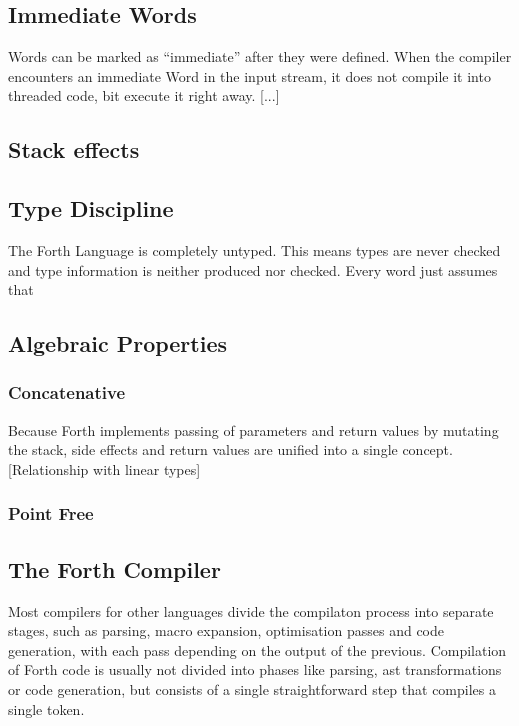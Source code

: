 \documentclass{llncs}
\begin{document}


\subsection{Immediate Words}

Words can be marked as ``immediate''  after they were defined.
When the compiler encounters an immediate Word in the input stream, it does not compile it into threaded code, bit execute it right away.
[...]

\subsection{Stack effects}



\subsection{Type Discipline}

The Forth Language is completely untyped.
This means types are never checked and type information is neither produced nor checked.
Every word just assumes that

\subsection{Algebraic Properties}

\subsubsection{Concatenative}

Because Forth implements passing of parameters and return values by mutating the stack, side effects and return values are unified into a single concept.
[Relationship with linear types]

\subsubsection{Point Free}


\subsection{The Forth Compiler}

Most compilers for other languages divide the compilaton process into separate stages, such as parsing, macro expansion, optimisation passes and code generation, with each pass depending on the output of the previous.
Compilation of Forth code is usually not divided into phases like parsing, ast transformations or code generation, but consists of a single straightforward step that compiles a single token.
\end{document}
